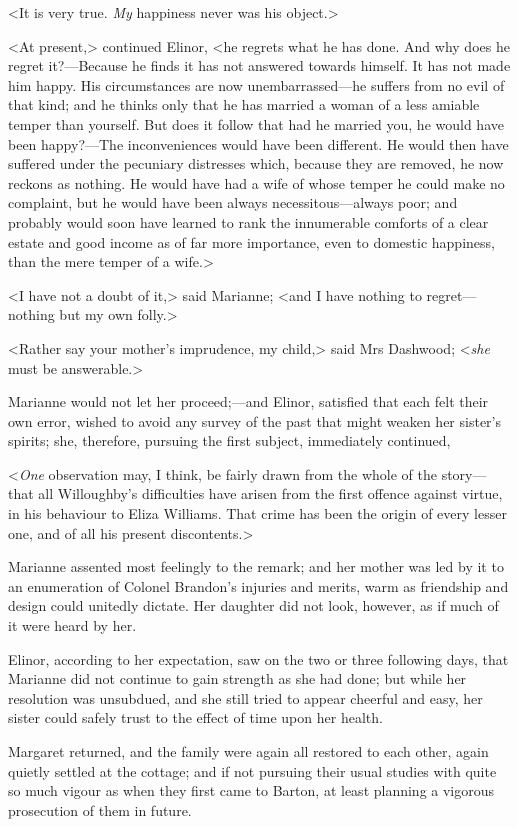 <It is very true. \textit{My} happiness never was his object.>

<At present,> continued Elinor, <he regrets what he has done. And why does he regret it?—Because he finds it has not answered towards himself. It has not made him happy. His circumstances are now unembarrassed—he suffers from no evil of that kind; and he thinks only that he has married a woman of a less amiable temper than yourself. But does it follow that had he married you, he would have been happy?—The inconveniences would have been different. He would then have suffered under the pecuniary distresses which, because they are removed, he now reckons as nothing. He would have had a wife of whose temper he could make no complaint, but he would have been always necessitous—always poor; and probably would soon have learned to rank the innumerable comforts of a clear estate and good income as of far more importance, even to domestic happiness, than the mere temper of a wife.>

<I have not a doubt of it,> said Marianne; <and I have nothing to regret—nothing but my own folly.>

<Rather say your mother's imprudence, my child,> said Mrs Dashwood; <\textit{she} must be answerable.>

Marianne would not let her proceed;—and Elinor, satisfied that each felt their own error, wished to avoid any survey of the past that might weaken her sister's spirits; she, therefore, pursuing the first subject, immediately continued,

<\textit{One} observation may, I think, be fairly drawn from the whole of the story—that all Willoughby's difficulties have arisen from the first offence against virtue, in his behaviour to Eliza Williams. That crime has been the origin of every lesser one, and of all his present discontents.>

Marianne assented most feelingly to the remark; and her mother was led by it to an enumeration of Colonel Brandon's injuries and merits, warm as friendship and design could unitedly dictate. Her daughter did not look, however, as if much of it were heard by her.

Elinor, according to her expectation, saw on the two or three following days, that Marianne did not continue to gain strength as she had done; but while her resolution was unsubdued, and she still tried to appear cheerful and easy, her sister could safely trust to the effect of time upon her health.

Margaret returned, and the family were again all restored to each other, again quietly settled at the cottage; and if not pursuing their usual studies with quite so much vigour as when they first came to Barton, at least planning a vigorous prosecution of them in future.

